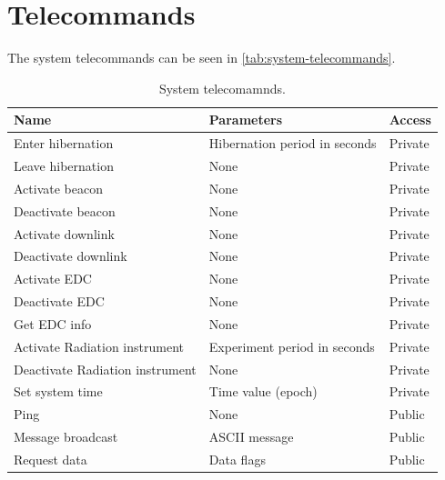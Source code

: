 \section{Telecommands}

The system telecommands can be seen in \autoref{tab:system-telecommands}.

\begin{table}[!ht]
    \centering
    \begin{tabular}{lll}
        \toprule[1.5pt]
        \textbf{Name}          & \textbf{Parameters}           & \textbf{Access} \\
        \midrule
        Enter hibernation      & Hibernation period in seconds & Private         \\
        Leave hibernation      & None                          & Private         \\
        Activate beacon        & None                          & Private         \\
        Deactivate beacon      & None                          & Private         \\
        Activate downlink      & None                          & Private         \\
        Deactivate downlink    & None                          & Private         \\
        Activate EDC           & None                          & Private         \\
        Deactivate EDC         & None                          & Private         \\
        Get EDC info           & None                          & Private         \\
        Activate Radiation instrument     & Experiment period in seconds  & Private         \\
        Deactivate Radiation instrument   & None                          & Private         \\
        Set system time        & Time value (epoch)            & Private         \\
        Ping                   & None                          & Public          \\
        Message broadcast      & ASCII message                 & Public          \\
        Request data           & Data flags                    & Public          \\
        \bottomrule[1.5pt]
    \end{tabular}
    \caption{System telecomamnds.}
    \label{tab:system-telecommands}
\end{table}

